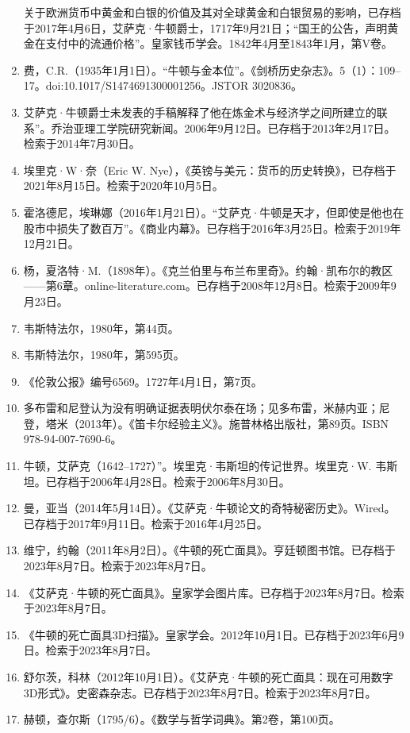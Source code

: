 \begin{enumerate}
关于欧洲货币中黄金和白银的价值及其对全球黄金和白银贸易的影响，已存档于2017年4月6日，艾萨克·牛顿爵士，1717年9月21日；“国王的公告，声明黄金在支付中的流通价格”。皇家钱币学会。1842年4月至1843年1月，第V卷。  
\item 费，C.R.（1935年1月1日）。“牛顿与金本位”。《剑桥历史杂志》。5（1）：109–17。doi:10.1017/S1474691300001256。JSTOR 3020836。  
\item 艾萨克·牛顿爵士未发表的手稿解释了他在炼金术与经济学之间所建立的联系”。乔治亚理工学院研究新闻。2006年9月12日。已存档于2013年2月17日。检索于2014年7月30日。
\item 埃里克·W·奈（Eric W. Nye），《英镑与美元：货币的历史转换》，已存档于2021年8月15日。检索于2020年10月5日。  
\item 霍洛德尼，埃琳娜（2016年1月21日）。“艾萨克·牛顿是天才，但即使是他也在股市中损失了数百万”。《商业内幕》。已存档于2016年3月25日。检索于2019年12月21日。
\item 杨，夏洛特·M.（1898年）。《克兰伯里与布兰布里奇》。约翰·凯布尔的教区——第6章。online-literature.com。已存档于2008年12月8日。检索于2009年9月23日。  
\item 韦斯特法尔，1980年，第44页。  
\item 韦斯特法尔，1980年，第595页。  
\item 《伦敦公报》编号6569。1727年4月1日，第7页。  
\item 多布雷和尼登认为没有明确证据表明伏尔泰在场；见多布雷，米赫内亚；尼登，塔米（2013年）。《笛卡尔经验主义》。施普林格出版社，第89页。ISBN 978-94-007-7690-6。  
\item 牛顿，艾萨克（1642–1727）”。埃里克·韦斯坦的传记世界。埃里克·W. 韦斯坦。已存档于2006年4月28日。检索于2006年8月30日。
\item 曼，亚当（2014年5月14日）。《艾萨克·牛顿论文的奇特秘密历史》。Wired。已存档于2017年9月11日。检索于2016年4月25日。  
\item 维宁，约翰（2011年8月2日）。《牛顿的死亡面具》。亨廷顿图书馆。已存档于2023年8月7日。检索于2023年8月7日。  
\item 《艾萨克·牛顿的死亡面具》。皇家学会图片库。已存档于2023年8月7日。检索于2023年8月7日。  
\item 《牛顿的死亡面具3D扫描》。皇家学会。2012年10月1日。已存档于2023年6月9日。检索于2023年8月7日。  
\item 舒尔茨，科林（2012年10月1日）。《艾萨克·牛顿的死亡面具：现在可用数字3D形式》。史密森杂志。已存档于2023年8月7日。检索于2023年8月7日。
\item 赫顿，查尔斯（1795/6）。《数学与哲学词典》。第2卷，第100页。  

\end{enumerate}
